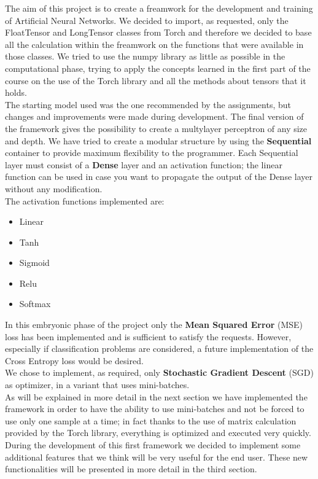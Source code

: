 The aim of this project is to create a freamwork for the development and training of Artificial Neural Networks. We decided to import, as requested, only the FloatTensor and LongTensor classes from Torch and therefore we decided to base all the calculation within the freamwork on the functions that were available in those classes. We tried to use the numpy library as little as possible in the computational phase, trying to apply the concepts learned in the first part of the course on the use of the Torch library and all the methods about tensors that it holds.\\
The starting model used was the one recommended by the assignments, but changes and improvements were made during development. The final version of the framework gives the possibility to create a multylayer perceptron of any size and depth. We have tried to create a modular structure by using the \textbf{Sequential} container to provide maximum flexibility to the programmer. Each Sequential layer must consist of a \textbf{Dense} layer and an activation function; the linear function can be used in case you want to propagate the output of the Dense layer without any modification. \\
The activation functions implemented are:
\begin{itemize}
	\item Linear
	\item Tanh
	\item Sigmoid
	\item Relu
	\item Softmax
\end{itemize}
In this embryonic phase of the project only the \textbf{Mean Squared Error} (MSE) loss has been implemented and is sufficient to satisfy the requests. However, especially if classification problems are considered, a future implementation of the Cross Entropy loss would be desired. \\
We chose to implement, as required, only \textbf{Stochastic Gradient Descent} (SGD) as optimizer, in a variant that uses mini-batches. \\
As will be explained in more detail in the next section we have implemented the framework in order to have the ability to use mini-batches and not be forced to use only one sample at a time; in fact thanks to the use of matrix calculation provided by the Torch library, everything is optimized and executed very quickly. \\
During the development of this first framework we decided to implement some additional features that we think will be very useful for the end user. These new functionalities will be presented in more detail in the third section.
